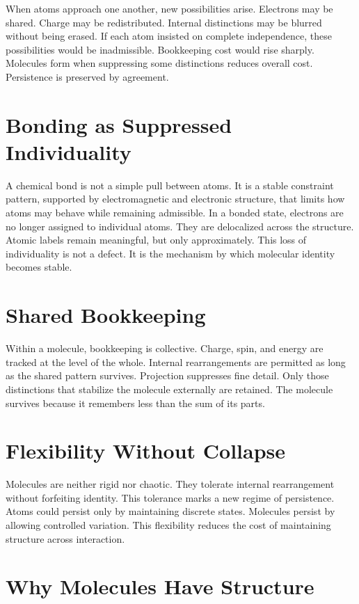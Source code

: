 \documentclass[11pt,twoside,openright]{book}
\begin{document}
When atoms approach one another, new possibilities arise. Electrons may be shared. Charge may be redistributed. Internal distinctions may be blurred without being erased. If each atom insisted on complete independence, these possibilities would be inadmissible. Bookkeeping cost would rise sharply. Molecules form when suppressing some distinctions reduces overall cost. Persistence is preserved by agreement.

\section*{Bonding as Suppressed Individuality}

A chemical bond is not a simple pull between atoms. It is a stable constraint pattern, supported by electromagnetic and electronic structure, that limits how atoms may behave while remaining admissible. In a bonded state, electrons are no longer assigned to individual atoms. They are delocalized across the structure. Atomic labels remain meaningful, but only approximately. This loss of individuality is not a defect. It is the mechanism by which molecular identity becomes stable.

\section*{Shared Bookkeeping}

Within a molecule, bookkeeping is collective. Charge, spin, and energy are tracked at the level of the whole. Internal rearrangements are permitted as long as the shared pattern survives. Projection suppresses fine detail. Only those distinctions that stabilize the molecule externally are retained. The molecule survives because it remembers less than the sum of its parts.

\section*{Flexibility Without Collapse}

Molecules are neither rigid nor chaotic. They tolerate internal rearrangement without forfeiting identity. This tolerance marks a new regime of persistence. Atoms could persist only by maintaining discrete states. Molecules persist by allowing controlled variation. This flexibility reduces the cost of maintaining structure across interaction.

\section*{Why Molecules Have Structure}
\end{document}
